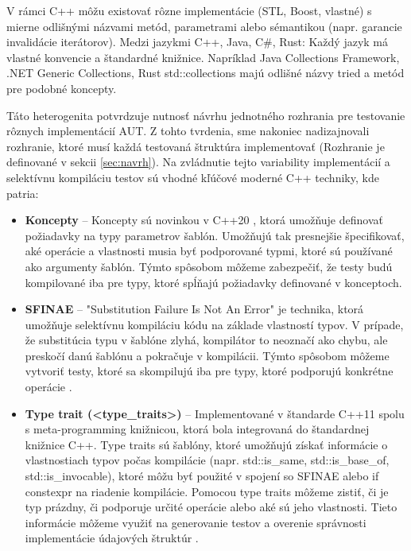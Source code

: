 \documentclass[11pt]{article}
\begin{document}
V rámci C++ môžu existovať rôzne implementácie (STL, Boost, vlastné) s mierne odlišnými názvami metód, parametrami alebo sémantikou (napr. garancie invalidácie iterátorov). Medzi jazykmi C++, Java, C\#, Rust: Každý jazyk má vlastné konvencie a štandardné knižnice. Napríklad Java Collections Framework, .NET Generic Collections, Rust std::collections majú odlišné názvy tried a metód pre podobné koncepty.

Táto heterogenita potvrdzuje nutnosť návrhu jednotného rozhrania pre testovanie rôznych implementácií AUT. Z tohto tvrdenia, sme nakoniec nadizajnovali rozhranie, ktoré musí každá testovaná štruktúra implementovať (Rozhranie je definované v sekcii \ref{sec:navrh}). Na zvládnutie tejto variability implementácií a selektívnu kompiláciu testov sú vhodné kľúčové moderné C++ techniky, kde patria:

\begin{itemize}
    \item \textbf{Koncepty} -- Koncepty sú novinkou v C++20 \cite{cppreference_concepts}, ktorá umožňuje definovať požiadavky na typy parametrov šablón. Umožňujú tak presnejšie špecifikovať, aké operácie a vlastnosti musia byť podporované typmi, ktoré sú používané ako argumenty šablón. Týmto spôsobom môžeme zabezpečiť, že testy budú kompilované iba pre typy, ktoré spĺňajú požiadavky definované v konceptoch.
    \item \textbf{SFINAE} -- "Substitution Failure Is Not An Error" je technika, ktorá umožňuje selektívnu kompiláciu kódu na základe vlastností typov. V prípade, že substitúcia typu v šablóne zlyhá, kompilátor to neoznačí ako chybu, ale preskočí danú šablónu a pokračuje v kompilácii. Týmto spôsobom môžeme vytvoriť testy, ktoré sa skompilujú iba pre typy, ktoré podporujú konkrétne operácie \cite{cppreference_sfinae}.
    \item \textbf{Type trait (<type\_traits>)} -- Implementované v štandarde C++11 spolu s meta-programming knižnicou, ktorá bola integrovaná do štandardnej knižnice C++. Type traits sú šablóny, ktoré umožňujú získať informácie o vlastnostiach typov počas kompilácie (napr. std::is\_same, std::is\_base\_of, std::is\_invocable), ktoré môžu byť použité v spojení so SFINAE alebo if constexpr na riadenie kompilácie. Pomocou type traits môžeme zistiť, či je typ prázdny, či podporuje určité operácie alebo aké sú jeho vlastnosti. Tieto informácie môžeme využiť na generovanie testov a overenie správnosti implementácie údajových štruktúr \cite{cppreference_type_traits}.
\end{itemize}
\end{document}
